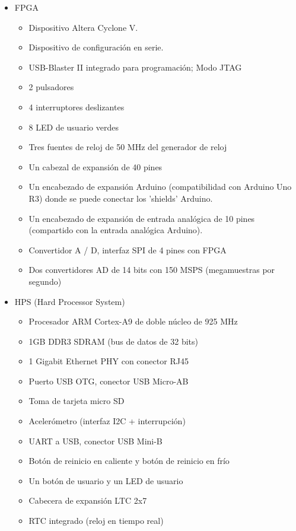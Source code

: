 \begin{itemize}
\item 	FPGA
	\begin{itemize}
	\item Dispositivo Altera Cyclone V.
	\item Dispositivo de configuración en serie.
	\item USB-Blaster II integrado para programación; Modo JTAG
	\item 2 pulsadores
	\item 4 interruptores deslizantes
	\item 8 LED de usuario verdes
	\item Tres fuentes de reloj de 50 MHz del generador de reloj
	\item Un cabezal de expansión de 40 pines
	\item Un encabezado de expansión Arduino (compatibilidad con Arduino Uno R3) donde se puede conectar los 'shields' Arduino.
	\item Un encabezado de expansión de entrada analógica de 10 pines (compartido con la entrada analógica Arduino).
	\item Convertidor A / D, interfaz SPI de 4 pines con FPGA
	\item  Dos convertidores AD de 14 bits con 150 MSPS (megamuestras por segundo)
	\end{itemize}
	
	
\item HPS (Hard Processor System)
	\begin{itemize}
	\item Procesador ARM Cortex-A9 de doble núcleo de 925 MHz
	\item 1GB DDR3 SDRAM (bus de datos de 32 bits)
	\item 1 Gigabit Ethernet PHY con conector RJ45
	\item Puerto USB OTG, conector USB Micro-AB
	\item Toma de tarjeta micro SD
	\item Acelerómetro (interfaz I2C + interrupción)
	\item UART a USB, conector USB Mini-B
	\item Botón de reinicio en caliente y botón de reinicio en frío
	\item Un botón de usuario y un LED de usuario
	\item Cabecera de expansión LTC 2x7
	\item RTC integrado (reloj en tiempo real)
	\end{itemize}
\end{itemize}


